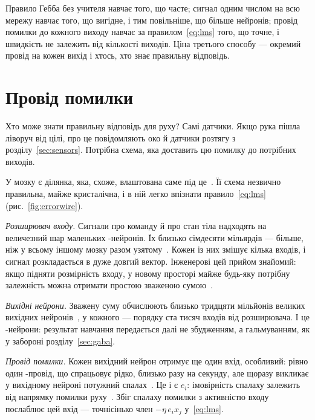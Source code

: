 \begin{keyblock}
\begin{proposition}
\label{prop:teachers}
Правило Гебба без учителя навчає того, що часте; сигнал  одним числом на всю мережу навчає того, що вигідне, і тим повільніше, що більше нейронів; провід помилки до кожного виходу навчає за правилом~\eqref{eq:lms} того, що точне, і швидкість не залежить від кількості виходів. Ціна третього способу --- окремий провід на кожен вихід і хтось, хто знає правильну відповідь.
\end{proposition}
\end{keyblock}

\section{Провід помилки}

Хто може знати правильну відповідь для руху? Самі датчики. Якщо рука пішла ліворуч від цілі, про це повідомляють око й датчики розтягу з розділу~\ref{sec:sensors}. Потрібна схема, яка доставить цю помилку до потрібних виходів.

У мозку є ділянка, яка, схоже, влаштована саме під це~\cite{Marr1969,Albus1971}. Її схема незвично правильна, майже кристалічна, і в ній легко впізнати правило~\eqref{eq:lms} (рис.~\ref{fig:errorwire}).

\emph{Розширювач входу.} Сигнали про команду й про стан тіла надходять на величезний шар маленьких -нейронів. Їх близько сімдесяти мільярдів --- більше, ніж у всьому іншому мозку разом узятому~\cite{Azevedo2009}. Кожен із них змішує кілька входів, і сигнал розкладається в дуже довгий вектор. Інженерові цей прийом знайомий: якщо підняти розмірність входу, у новому просторі майже будь-яку потрібну залежність можна отримати простою зваженою сумою~\cite{Cover1965}.

\emph{Вихідні нейрони.} Зважену суму обчислюють близько тридцяти мільйонів великих вихідних нейронів~\cite{Andersen1992cereb}, у кожного --- порядку ста тисяч входів від розширювача. І це -нейрони: результат навчання передається далі не збудженням, а гальмуванням, як у забороні розділу~\ref{sec:gaba}.

\emph{Провід помилки.} Кожен вихідний нейрон отримує ще один вхід, особливий: рівно один -провід, що спрацьовує рідко, близько разу на секунду, але щоразу викликає у вихідному нейроні потужний спалах~\cite{Ito2001}. Це і є $e_i$: імовірність спалаху залежить від напрямку помилки руху~\cite{Herzfeld2018}. Збіг спалаху помилки з активністю входу послаблює цей вхід --- точнісінько член $-\eta\,e_i x_j$ у~\eqref{eq:lms}.

